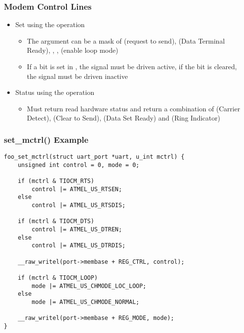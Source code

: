 \begin{frame}
  \frametitle{Modem Control Lines}
  \begin{itemize}
  \item Set using the  operation
    \begin{itemize}
    \item The  argument can be a mask of 
      (request to send),  (Data Terminal Ready),
      , ,  (enable
      loop mode)
    \item If a bit is set in , the signal must be driven
      active, if the bit is cleared, the signal must be driven
      inactive
    \end{itemize}
  \item Status using the  operation
    \begin{itemize}
    \item Must return read hardware status and return a combination of
       (Carrier Detect),  (Clear to
      Send),  (Data Set Ready) and 
      (Ring Indicator)
    \end{itemize}
  \end{itemize}
\end{frame}

\begin{frame}[fragile]
  \frametitle{set\_mctrl() Example}
\begin{verbatim}
foo_set_mctrl(struct uart_port *uart, u_int mctrl) {
    unsigned int control = 0, mode = 0;

    if (mctrl & TIOCM_RTS)
        control |= ATMEL_US_RTSEN;
    else
        control |= ATMEL_US_RTSDIS;

    if (mctrl & TIOCM_DTS)
        control |= ATMEL_US_DTREN;
    else
        control |= ATMEL_US_DTRDIS;

    __raw_writel(port->membase + REG_CTRL, control);

    if (mctrl & TIOCM_LOOP)
        mode |= ATMEL_US_CHMODE_LOC_LOOP;
    else
        mode |= ATMEL_US_CHMODE_NORMAL;

    __raw_writel(port->membase + REG_MODE, mode);
}
\end{verbatim}
\end{frame}

